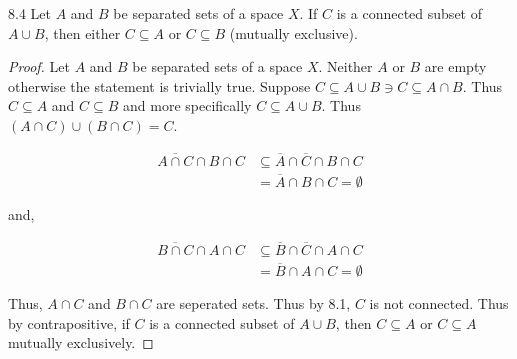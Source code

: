 \documentclass{article}
\newcommand*{\subeq}{\subseteq}
\newcommand*{\empset}{\emptyset}
\begin{document}
\begin{claim}{8.4}\label{Claim 8.4.}
    Let $A$ and $B$ be separated sets of a space $X$. If $C$ is a connected subset of $A \cup B$, then either $C \subeq A$ or $C \subeq B$ (mutually exclusive).        
\end{claim}
\begin{proof}  
    Let $A$ and $B$ be separated sets of a space $X$. Neither $A$ or $B$ are empty otherwise the statement is trivially true. Suppose $C \subeq A \cup B \ni C \subeq A \cap B$. Thus $C \subeq A$ and $C \subeq B$ and more specifically $C \subeq A \cup B$. Thus $(A \cap C) \cup (B \cap C) = C$.
    
    \begin{align*}
        \overline{A \cap C} \cap B \cap C &\subeq \overline{A} \cap \overline{C} \cap B \cap C \\
        &= \overline{A} \cap B \cap C = \empset 
    \end{align*}

    and, 

    \begin{align*}
        \overline{B \cap C} \cap A \cap C &\subeq \overline{B} \cap \overline{C} \cap A \cap C \\
        &= \overline{B} \cap A \cap C = \empset
    \end{align*} 

    Thus, $A \cap C$ and $B \cap C$ are seperated sets. Thus by 8.1, $C$ is not connected. Thus by contrapositive, if $C$ is a connected subset of $A \cup B$, then $C \subeq A$ or $C \subeq A$ mutually exclusively.        
\end{proof}

\bigskip
\end{document}
